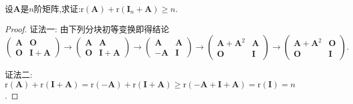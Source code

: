 \documentclass[lang=cn,newtx,10pt,scheme=chinese]{elegantbook}
\begin{document}
\begin{example}
设\(\boldsymbol{A}\)是\(n\)阶矩阵,求证:\(\mathrm{r}(\boldsymbol{A})+\mathrm{r}(\boldsymbol{I}_n+\boldsymbol{A})\geq n\).
\end{example}
\begin{proof}
{\color{blue}证法一:}
由下列分块初等变换即得结论
\[
\begin{pmatrix}
\boldsymbol{A}&\boldsymbol{O}\\
\boldsymbol{O}&\boldsymbol{I}+\boldsymbol{A}
\end{pmatrix}\to
\begin{pmatrix}
\boldsymbol{A}&\boldsymbol{A}\\
\boldsymbol{O}&\boldsymbol{I}+\boldsymbol{A}
\end{pmatrix}\to
\begin{pmatrix}
\boldsymbol{A}&\boldsymbol{A}\\
-\boldsymbol{A}&\boldsymbol{I}
\end{pmatrix}\to
\begin{pmatrix}
\boldsymbol{A}+\boldsymbol{A}^2&\boldsymbol{A}\\
\boldsymbol{O}&\boldsymbol{I}
\end{pmatrix}\to
\begin{pmatrix}
\boldsymbol{A}+\boldsymbol{A}^2&\boldsymbol{O}\\
\boldsymbol{O}&\boldsymbol{I}
\end{pmatrix}.
\]

{\color{blue}证法二:}
\(\mathrm{r}(\boldsymbol{A})+\mathrm{r}(\boldsymbol{I}+\boldsymbol{A})=\mathrm{r}(-\boldsymbol{A})+\mathrm{r}(\boldsymbol{I}+\boldsymbol{A})\geq\mathrm{r}(-\boldsymbol{A}+\boldsymbol{I}+\boldsymbol{A})=\mathrm{r}(\boldsymbol{I}) = n\).
\end{proof}
\end{document}
